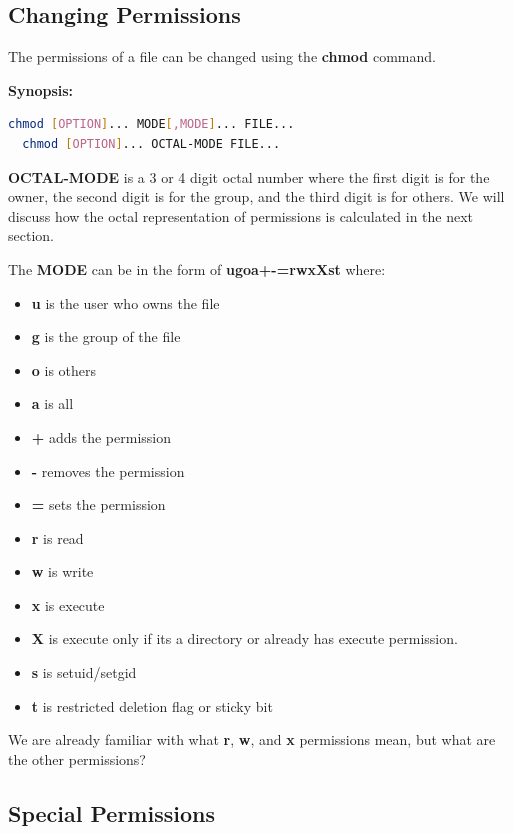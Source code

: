 \subsection{Changing Permissions}

The permissions of a file can be changed using the \textbf{chmod} command.

\textbf{Synopsis:}

\begin{lstlisting}[language=bash]
  chmod [OPTION]... MODE[,MODE]... FILE...
  chmod [OPTION]... OCTAL-MODE FILE...
\end{lstlisting}

\textbf{OCTAL-MODE} is a 3 or 4 digit octal number where the first digit is for the owner, the second digit is for the group, and the third digit is for others.
We will discuss how the octal representation of permissions is calculated in the next section.

The \textbf{MODE} can be in the form of \textbf{ugoa+-=rwxXst} where:

\begin{itemize}
  \item \textbf{u} is the user who owns the file
  \item \textbf{g} is the group of the file
  \item \textbf{o} is others
  \item \textbf{a} is all
  \item \textbf{+} adds the permission
  \item \textbf{-} removes the permission
  \item \textbf{={}} sets the permission
  \item \textbf{r} is read
  \item \textbf{w} is write
  \item \textbf{x} is execute
  \item \textbf{X} is execute only if its a directory or already has execute permission.
  \item \textbf{s} is setuid/setgid
  \item \textbf{t} is restricted deletion flag or sticky bit
\end{itemize}

We are already familiar with what
\textbf{r},
\textbf{w}, and
\textbf{x}
permissions mean, but what are the other permissions?

\subsection{Special Permissions}

